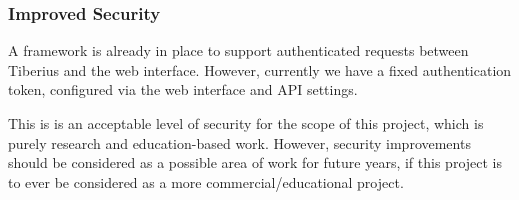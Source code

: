 \subsubsection{Improved Security}
A framework is already in place to support authenticated requests between
Tiberius and the web interface. However, currently we have a fixed
authentication token, configured via the web interface and API settings.

This is is an acceptable level of security for the scope of this project, which
is purely research and education-based work. However, security improvements
should be considered as a possible area of work for future years, if this
project is to ever be considered as a more commercial/educational project.
